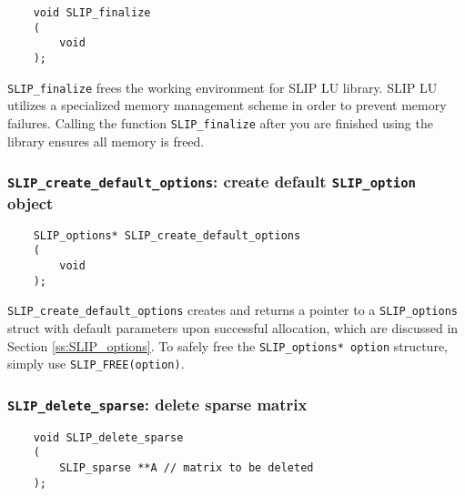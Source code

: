 \documentclass[12pt]{article}
\theoremstyle{definition}
\begin{document}
\begin{mdframed}[userdefinedwidth=6in]
{\footnotesize
\begin{verbatim}
    void SLIP_finalize
    (
        void
    );
\end{verbatim}
} \end{mdframed}

\verb|SLIP_finalize| frees the working environment for SLIP LU library. SLIP LU
utilizes a specialized memory management scheme in order to prevent memory
failures. Calling the function \verb|SLIP_finalize| after you are finished
using the library ensures all memory is freed.

\cprotect\subsubsection{\verb|SLIP_create_default_options|: create default \verb|SLIP_option| object}
\label{ss:create_default_options}

\begin{mdframed}[userdefinedwidth=6in]
{\footnotesize
\begin{verbatim}
    SLIP_options* SLIP_create_default_options
    (
        void
    );
\end{verbatim}
} \end{mdframed}

\verb|SLIP_create_default_options| creates and returns a pointer to a
\verb|SLIP_options| struct with default parameters upon successful allocation,
which are discussed in Section \ref{ss:SLIP_options}.  To safely free the
\verb|SLIP_options* option| structure, simply use \verb|SLIP_FREE(option)|.

\cprotect\subsubsection{\verb|SLIP_delete_sparse|: delete sparse matrix}
\label{ss:delete_sparse}

\begin{mdframed}[userdefinedwidth=6in]
{\footnotesize
\begin{verbatim}
    void SLIP_delete_sparse
    (
        SLIP_sparse **A // matrix to be deleted
    );
\end{verbatim}
} \end{mdframed}
\end{document}
